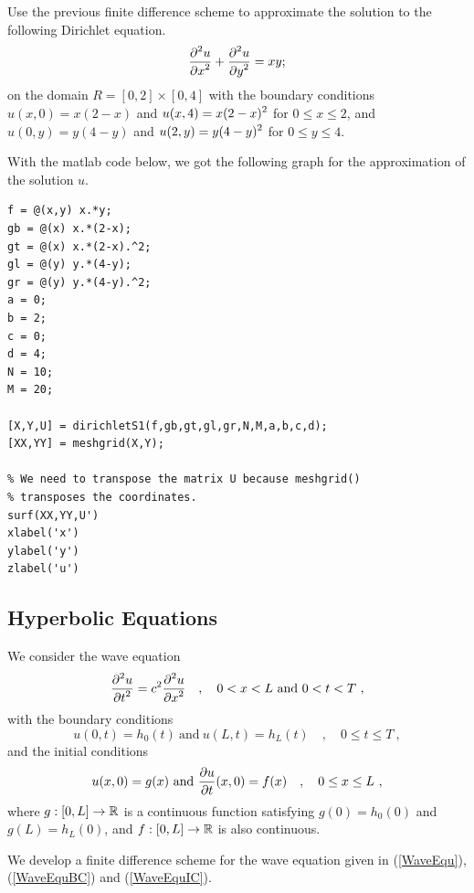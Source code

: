 \begin{egg}
Use the previous finite difference scheme to approximate the solution to
the following Dirichlet equation.
\[
\frac{\displaystyle \partial^{2}{u}} {\displaystyle \partial{x}^{2}} + \frac{\displaystyle \partial^{2}{u}} {\displaystyle \partial{y}^{2}} = xy;
\]
on the domain $R=[0,2] \times [0,4]$ with the boundary conditions
$u(x,0) = x(2-x)$ and $\displaystyle u(x,4) = x(2-x)^2$ for
$0 \leq x \leq 2$, and $u(0,y) = y(4-y)$ and
$\displaystyle u(2,y) = y(4-y)^2$ for $0 \leq y \leq 4$.

With the matlab code below, we got the following graph for the
approximation of the solution $u$.

\begin{code}
\small
\begin{verbatim}
f = @(x,y) x.*y;
gb = @(x) x.*(2-x);
gt = @(x) x.*(2-x).^2;
gl = @(y) y.*(4-y);
gr = @(y) y.*(4-y).^2;
a = 0;
b = 2;
c = 0;
d = 4;
N = 10;
M = 20;

[X,Y,U] = dirichletS1(f,gb,gt,gl,gr,N,M,a,b,c,d);
[XX,YY] = meshgrid(X,Y);

% We need to transpose the matrix U because meshgrid()
% transposes the coordinates.
surf(XX,YY,U')
xlabel('x')
ylabel('y')
zlabel('u')
\end{verbatim}
\end{code}
\end{egg}

\subsection{Hyperbolic Equations} \label{DerWaveSection}

We consider the wave equation
\begin{equation}\label{WaveEqu}
  \frac{\displaystyle \partial^{2}{u}} {\displaystyle \partial{t}^{2}} = c^2 \frac{\displaystyle \partial^{2}{u}} {\displaystyle \partial{x}^{2}} \quad , \quad
  0 < x < L \ \text{and} \ 0<t<T \ ,
\end{equation}
with the boundary conditions
\begin{equation}\label{WaveEquBC}
u(0,t)=h_0(t) \ \text{and} \ u(L,t)=h_L(t) \quad , \quad 0\leq t \leq T \ ,
\end{equation}
and the initial conditions
\begin{equation} \label{WaveEquIC}
u(x,0) = g(x) \ \text{and} \ \frac{\partial{u}}{\partial{t}}(x,0) = f(x) \quad , \quad
 0 \leq x \leq L \ ,
\end{equation}
where $g:[0,L]\rightarrow \mathbb{R}$ is a continuous function satisfying
$g(0)=h_0(0)$ and $g(L)=h_L(0)$, and $f:[0,L]\rightarrow \mathbb{R}$ is also
continuous.

We develop a finite difference scheme for the wave equation given
in (\ref{WaveEqu}), (\ref{WaveEquBC}) and (\ref{WaveEquIC}).

